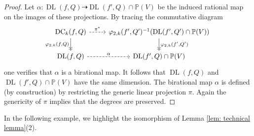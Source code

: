 \documentclass[11pt,reqno]{amsart}
\numberwithin{equation}{section}
\theoremstyle{plain}
\numberwithin{theorem}{section}
\theoremstyle{definition}
\renewcommand{\P}{\mathbb{P}}
\newcommand{\DC}{\operatorname{DC}}
\newcommand{\DL}{\operatorname{DL}}
\begin{document}
\begin{proof}
Let $\alpha\colon \DL(f,Q)\dashrightarrow\DL(f',Q)\cap\P(V)$ be the induced rational map on the images of these projections. 
By tracing the commutative diagram
\[
\begin{tikzcd}
\DC_k(f,Q)\arrow[dashed, r, "\pi^*" above] \arrow[swap,->>]{d}{\varphi_{2,k}(f,Q)} & \varphi_{2,k}(f',Q')^{-1}(\DL(f',Q')\cap \P(V)) \arrow[->>]{d}{\varphi_{2,k}(f',Q')} \\
\DL(f,Q) \arrow[dashed]{r}{\alpha} & \DL(f',Q)\cap\P(V)
\end{tikzcd}
\]
one verifies that  $\alpha$ is a birational map. It follows that $\DL(f,Q)$ and  $\DL(f',Q)\cap\P(V)$ have the same dimension. The birational map $\alpha$ is defined (by construction) by restricting the generic linear projection $\pi.$ Again the genericity of $\pi$ implies that the degrees are preserved. 
\end{proof}


In the following example, we highlight the isomorphism of Lemma \ref{lem: technical lemma}(2).
\end{document}
